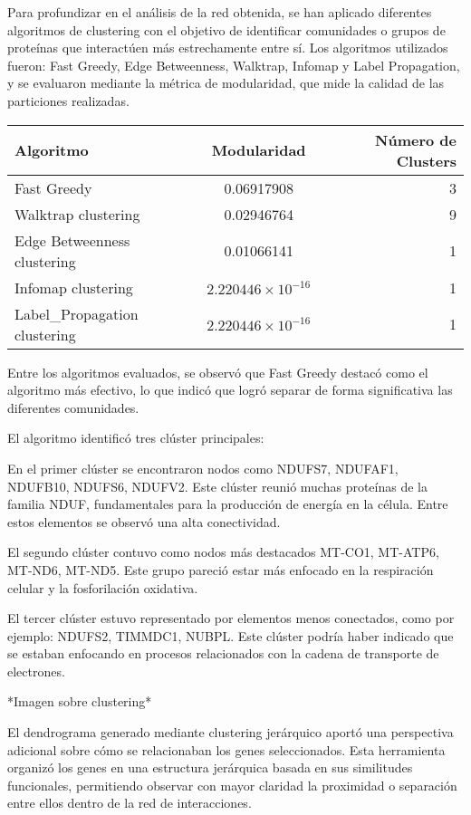 Para profundizar en el análisis de la red obtenida, se han aplicado diferentes algoritmos de clustering con el objetivo de identificar comunidades o grupos de proteínas que interactúen más estrechamente entre sí. Los algoritmos utilizados fueron: Fast Greedy, Edge Betweenness, Walktrap, Infomap y Label Propagation, y se evaluaron mediante la métrica de modularidad, que mide la calidad de las particiones realizadas.
\vspace{1em}

\begin{tabular}{|l|c|r|}
	\hline
	\textbf{Algoritmo} & \textbf{Modularidad} & \textbf{Número de Clusters} \\
	\hline
	Fast Greedy & 0.06917908 & 3 \\
	\hline
	Walktrap clustering & 0.02946764 & 9 \\
	\hline
	Edge Betweenness clustering & 0.01066141 & 1 \\
	\hline
	Infomap clustering & \(2.220446 \times 10^{-16}\) & 1 \\
	\hline
	Label\_Propagation clustering & \(2.220446 \times 10^{-16}\) & 1 \\
	\hline
\end{tabular}


\vspace{1em}
	

Entre los algoritmos evaluados, se observó que Fast Greedy destacó como el algoritmo más efectivo, lo que indicó que logró separar de forma significativa las diferentes comunidades.

El algoritmo identificó tres clúster principales:

En el primer clúster se encontraron nodos como NDUFS7, NDUFAF1, NDUFB10, NDUFS6, NDUFV2. Este clúster reunió muchas proteínas de la familia NDUF, fundamentales para la producción de energía en la célula. Entre estos elementos se observó una alta conectividad.

El segundo clúster contuvo como nodos más destacados MT-CO1, MT-ATP6, MT-ND6, MT-ND5. Este grupo pareció estar más enfocado en la respiración celular y la fosforilación oxidativa.

El tercer clúster estuvo representado por elementos menos conectados, como por ejemplo: NDUFS2, TIMMDC1, NUBPL. Este clúster podría haber indicado que se estaban enfocando en procesos relacionados con la cadena de transporte de electrones.


*Imagen sobre clustering* 

El dendrograma generado mediante clustering jerárquico aportó una perspectiva adicional sobre cómo se relacionaban los genes seleccionados. Esta herramienta organizó los genes en una estructura jerárquica basada en sus similitudes funcionales, permitiendo observar con mayor claridad la proximidad o separación entre ellos dentro de la red de interacciones.

